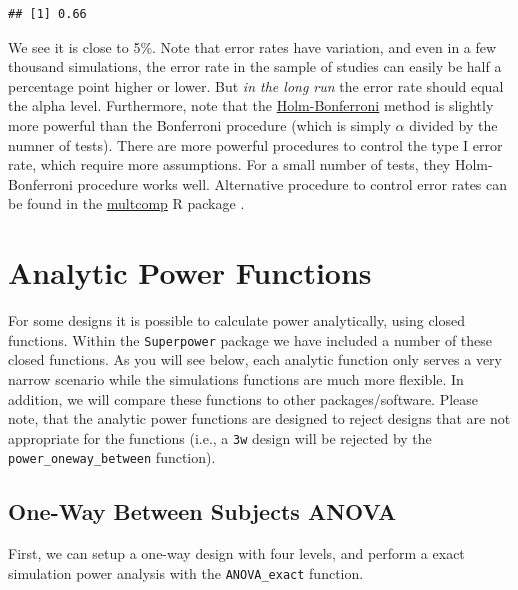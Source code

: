 \documentclass[
]{book}
\begin{document}
\begin{verbatim}
## [1] 0.66
\end{verbatim}

We see it is close to 5\%. Note that error rates have variation, and even in a few thousand simulations, the error rate in the sample of studies can easily be half a percentage point higher or lower. But \emph{in the long run} the error rate should equal the alpha level. Furthermore, note that the \href{https://en.wikipedia.org/wiki/Holm\%E2\%80\%93Bonferroni_method}{Holm-Bonferroni} method is slightly more powerful than the Bonferroni procedure (which is simply \(\alpha\) divided by the numner of tests). There are more powerful procedures to control the type I error rate, which require more assumptions. For a small number of tests, they Holm-Bonferroni procedure works well. Alternative procedure to control error rates can be found in the \href{https://cran.r-project.org/web/packages/multcomp/index.html}{multcomp} R package \citep{R-multcomp}.

\hypertarget{analytic-power-functions}{%
\chapter{Analytic Power Functions}\label{analytic-power-functions}}

For some designs it is possible to calculate power analytically, using closed functions. Within the \texttt{Superpower} package we have included a number of these closed functions. As you will see below, each analytic function only serves a very narrow scenario while the simulations functions are much more flexible. In addition, we will compare these functions to other packages/software. Please note, that the analytic power functions are designed to reject designs that are not appropriate for the functions (i.e., a \texttt{3w} design will be rejected by the \texttt{power\_oneway\_between} function).

\hypertarget{one-way-between-subjects-anova}{%
\section{One-Way Between Subjects ANOVA}\label{one-way-between-subjects-anova}}

First, we can setup a one-way design with four levels, and perform a exact simulation power analysis with the \texttt{ANOVA\_exact} function.
\end{document}
